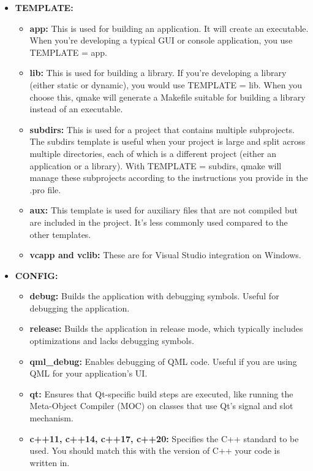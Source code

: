 \documentclass{report}
\begin{document}
    \begin{itemize}
        \item \textbf{TEMPLATE:} 
            \begin{itemize}
                \item \textbf{app:} This is used for building an application. It will create an executable. When you're developing a typical GUI or console application, you use TEMPLATE = app.
                \item \textbf{lib:} This is used for building a library. If you're developing a library (either static or dynamic), you would use TEMPLATE = lib. When you choose this, qmake will generate a Makefile suitable for building a library instead of an executable.
                \item \textbf{subdirs:} This is used for a project that contains multiple subprojects. The subdirs template is useful when your project is large and split across multiple directories, each of which is a different project (either an application or a library). With TEMPLATE = subdirs, qmake will manage these subprojects according to the instructions you provide in the .pro file.
                \item \textbf{aux:} This template is used for auxiliary files that are not compiled but are included in the project. It's less commonly used compared to the other templates.
                \item \textbf{vcapp and vclib:} These are for Visual Studio integration on Windows.
            \end{itemize}
        \item \textbf{CONFIG:}
            \begin{itemize}
                \item \textbf{debug:} Builds the application with debugging symbols. Useful for debugging the application.
                \item \textbf{release:} Builds the application in release mode, which typically includes optimizations and lacks debugging symbols.
                \item \textbf{qml\_debug:} Enables debugging of QML code. Useful if you are using QML for your application's UI.
                \item \textbf{qt:} Ensures that Qt-specific build steps are executed, like running the Meta-Object Compiler (MOC) on classes that use Qt's signal and slot mechanism.
                \item \textbf{c++11, c++14, c++17, c++20:} Specifies the C++ standard to be used. You should match this with the version of C++ your code is written in.

\end{itemize}
\end{itemize}
\end{document}
